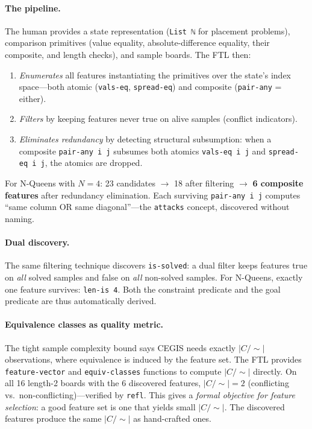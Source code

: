 \documentclass[9pt,a4paper]{article}
\theoremstyle{plain}
\theoremstyle{definition}
\theoremstyle{remark}
\begin{document}
\paragraph{The pipeline.}
The human provides a state representation (\texttt{List~ℕ} for placement problems), comparison primitives (value equality, absolute-difference equality, their composite, and length checks), and sample boards.  The FTL then:
\begin{enumerate}
\item \emph{Enumerates} all features instantiating the primitives over the state's index space---both atomic (\texttt{vals-eq}, \texttt{spread-eq}) and composite (\texttt{pair-any} = either).
\item \emph{Filters} by keeping features never true on alive samples (conflict indicators).
\item \emph{Eliminates redundancy} by detecting structural subsumption: when a composite \texttt{pair-any~i~j} subsumes both atomics \texttt{vals-eq~i~j} and \texttt{spread-eq~i~j}, the atomics are dropped.
\end{enumerate}

For N-Queens with $N=4$: 23 candidates $\to$ 18 after filtering $\to$ \textbf{6 composite features} after redundancy elimination.  Each surviving \texttt{pair-any~i~j} computes ``same column OR same diagonal''---the \texttt{attacks} concept, discovered without naming.

\paragraph{Dual discovery.}
The same filtering technique discovers \texttt{is-solved}: a dual filter keeps features true on \emph{all} solved samples and false on \emph{all} non-solved samples.  For N-Queens, exactly one feature survives: \texttt{len-is~4}.  Both the constraint predicate and the goal predicate are thus automatically derived.

\paragraph{Equivalence classes as quality metric.}
The tight sample complexity bound says CEGIS needs exactly $|C/{\sim}|$ observations, where equivalence is induced by the feature set.  The FTL provides \texttt{feature-vector} and \texttt{equiv-classes} functions to compute $|C/{\sim}|$ directly.  On all 16 length-2 boards with the 6 discovered features, $|C/{\sim}| = 2$ (conflicting vs.\ non-conflicting)---verified by \texttt{refl}.  This gives a \emph{formal objective for feature selection}: a good feature set is one that yields small $|C/{\sim}|$.  The discovered features produce the same $|C/{\sim}|$ as hand-crafted ones.
\end{document}
